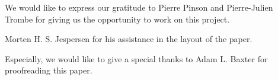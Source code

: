 
We would like to express our gratitude to Pierre Pinson and Pierre-Julien Trombe for giving us the opportunity to work on this project.

Morten H. S. Jespersen for his assistance in the layout of the paper.

Especially, we would like to give a special thanks to Adam L. Baxter for proofreading this paper.